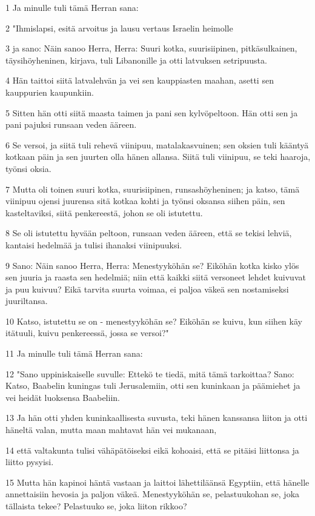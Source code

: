 \par 1 Ja minulle tuli tämä Herran sana:
\par 2 "Ihmislapsi, esitä arvoitus ja lausu vertaus Israelin heimolle
\par 3 ja sano: Näin sanoo Herra, Herra: Suuri kotka, suurisiipinen, pitkäsulkainen, täysihöyheninen, kirjava, tuli Libanonille ja otti latvuksen setripuusta.
\par 4 Hän taittoi siitä latvalehvän ja vei sen kauppiasten maahan, asetti sen kauppurien kaupunkiin.
\par 5 Sitten hän otti siitä maasta taimen ja pani sen kylvöpeltoon. Hän otti sen ja pani pajuksi runsaan veden ääreen.
\par 6 Se versoi, ja siitä tuli rehevä viinipuu, matalakasvuinen; sen oksien tuli kääntyä kotkaan päin ja sen juurten olla hänen allansa. Siitä tuli viinipuu, se teki haaroja, työnsi oksia.
\par 7 Mutta oli toinen suuri kotka, suurisiipinen, runsashöyheninen; ja katso, tämä viinipuu ojensi juurensa sitä kotkaa kohti ja työnsi oksansa siihen päin, sen kasteltaviksi, siitä penkereestä, johon se oli istutettu.
\par 8 Se oli istutettu hyvään peltoon, runsaan veden ääreen, että se tekisi lehviä, kantaisi hedelmää ja tulisi ihanaksi viinipuuksi.
\par 9 Sano: Näin sanoo Herra, Herra: Menestyyköhän se? Eiköhän kotka kisko ylös sen juuria ja raasta sen hedelmiä; niin että kaikki siitä versoneet lehdet kuivuvat ja puu kuivuu? Eikä tarvita suurta voimaa, ei paljoa väkeä sen nostamiseksi juuriltansa.
\par 10 Katso, istutettu se on - menestyyköhän se? Eiköhän se kuivu, kun siihen käy itätuuli, kuivu penkereessä, jossa se versoi?"
\par 11 Ja minulle tuli tämä Herran sana:
\par 12 "Sano uppiniskaiselle suvulle: Ettekö te tiedä, mitä tämä tarkoittaa? Sano: Katso, Baabelin kuningas tuli Jerusalemiin, otti sen kuninkaan ja päämiehet ja vei heidät luoksensa Baabeliin.
\par 13 Ja hän otti yhden kuninkaallisesta suvusta, teki hänen kanssansa liiton ja otti häneltä valan, mutta maan mahtavat hän vei mukanaan,
\par 14 että valtakunta tulisi vähäpätöiseksi eikä kohoaisi, että se pitäisi liittonsa ja liitto pysyisi.
\par 15 Mutta hän kapinoi häntä vastaan ja laittoi lähettiläänsä Egyptiin, että hänelle annettaisiin hevosia ja paljon väkeä. Menestyyköhän se, pelastuukohan se, joka tällaista tekee? Pelastuuko se, joka liiton rikkoo?
